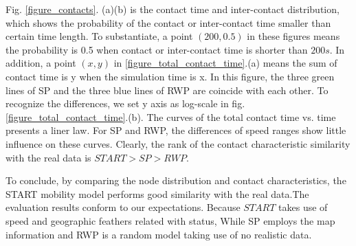 Fig. \ref{figure_contacts}. (a)(b) is the contact time and inter-contact distribution, which shows the probability of the contact or inter-contact time smaller than certain time length. To substantiate, a point $(200,0.5)$ in these figures means the probability is 0.5 when contact or inter-contact time is shorter than $200s$. In addition, a point $(x,y)$ in \ref{figure_total_contact_time}.(a) means the sum of contact time is y when the simulation time is x. In this figure, the three green lines of SP and the three blue lines of RWP are coincide with each other. To recognize the differences, we set y axis as log-scale in fig.\ref{figure_total_contact_time}.(b).
The curves of the total contact time vs. time presents a liner law. For SP and RWP, the differences of speed ranges show little influence on these curves.
Clearly, the rank of the contact characteristic similarity with the real data is $START>SP>RWP$.

To conclude, by comparing the node distribution and contact characteristics, the START mobility model performs good similarity with the real data.The evaluation results conform to our expectations. Because $START$ takes use of speed and geographic feathers related with status, While SP employs the map information and RWP is a random model taking use of no realistic data.

